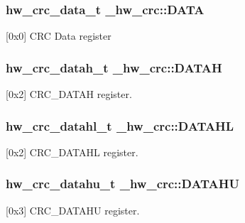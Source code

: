 \subsubsection[{\texorpdfstring{D\+A\+TA}{DATA}}]{ {\bf hw\+\_\+crc\+\_\+data\+\_\+t} \+\_\+hw\+\_\+crc\+::\+D\+A\+TA}\hypertarget{struct__hw__crc_a2afe4fac937ba7bf596871d5be13d126}{}\label{struct__hw__crc_a2afe4fac937ba7bf596871d5be13d126}
\mbox{[}0x0\mbox{]} C\+RC Data register 
\subsubsection[{\texorpdfstring{D\+A\+T\+AH}{DATAH}}]{ {\bf hw\+\_\+crc\+\_\+datah\+\_\+t} \+\_\+hw\+\_\+crc\+::\+D\+A\+T\+AH}\hypertarget{struct__hw__crc_a758e41fc3295c29098ba39a10ceb4b18}{}\label{struct__hw__crc_a758e41fc3295c29098ba39a10ceb4b18}
\mbox{[}0x2\mbox{]} C\+R\+C\+\_\+\+D\+A\+T\+AH register. 
\subsubsection[{\texorpdfstring{D\+A\+T\+A\+HL}{DATAHL}}]{ {\bf hw\+\_\+crc\+\_\+datahl\+\_\+t} \+\_\+hw\+\_\+crc\+::\+D\+A\+T\+A\+HL}\hypertarget{struct__hw__crc_aecb4e1ba4a6aa645329b8b5844cb3544}{}\label{struct__hw__crc_aecb4e1ba4a6aa645329b8b5844cb3544}
\mbox{[}0x2\mbox{]} C\+R\+C\+\_\+\+D\+A\+T\+A\+HL register. 
\subsubsection[{\texorpdfstring{D\+A\+T\+A\+HU}{DATAHU}}]{ {\bf hw\+\_\+crc\+\_\+datahu\+\_\+t} \+\_\+hw\+\_\+crc\+::\+D\+A\+T\+A\+HU}\hypertarget{struct__hw__crc_a028e1400ca87d21bdb3ff47b27bb7885}{}\label{struct__hw__crc_a028e1400ca87d21bdb3ff47b27bb7885}
\mbox{[}0x3\mbox{]} C\+R\+C\+\_\+\+D\+A\+T\+A\+HU register. 
